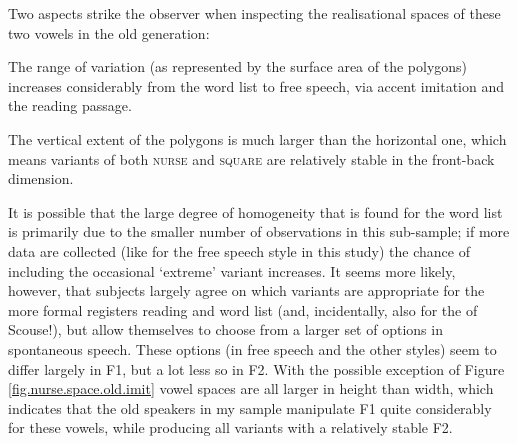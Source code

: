 Two aspects strike the observer when inspecting the realisational spaces of these two vowels in the old generation:
\begin{inparaenum}[(1)]
	\item The range of variation (as represented by the surface area of the polygons) increases considerably from the word list to free speech, via accent imitation and the reading passage.
	\item The vertical extent of the polygons is much larger than the horizontal one, which means variants of both \textsc{nurse} and \textsc{square} are relatively stable in the front-back dimension.
\end{inparaenum}
It is possible that the large degree of homogeneity that is found for the word list is primarily due to the smaller number of observations in this sub-sample; if more data are collected (like for the free speech style in this study) the chance of including the occasional `extreme' variant increases.
It seems more likely, however, that subjects largely agree on which variants are appropriate for the more formal registers reading and word list (and, incidentally, also for the  of Scouse!), but allow themselves to choose from a larger set of options in spontaneous speech.
These options (in free speech and the other styles) seem to differ largely in F1, but a lot less so in F2.
With the possible exception of Figure \ref{fig.nurse.space.old.imit} vowel spaces are all larger in height than width, which indicates that the old speakers in my sample manipulate F1 quite considerably for these vowels, while producing all variants with a relatively stable F2.

